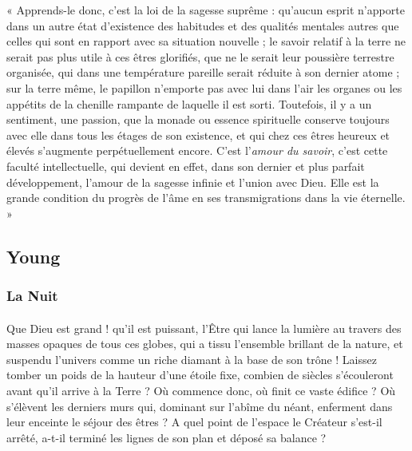 \documentclass[a4paper, 11pt, oneside]{article}
\begin{document}
« Apprends-le donc, c'est la loi de la sagesse suprême : qu'aucun esprit n'apporte dans un autre état d'existence des habitudes et des qualités mentales autres que celles qui sont en rapport avec sa situation nouvelle ; le savoir relatif à la terre ne serait pas plus utile à ces êtres glorifiés, que ne le serait leur poussière terrestre organisée, qui dans une température pareille serait réduite à son dernier atome ; sur la terre même, le papillon n'emporte pas avec lui dans l'air les organes ou les appétits de la chenille rampante de laquelle il est sorti. Toutefois, il y a un sentiment, une passion, que la monade ou essence spirituelle conserve toujours avec elle dans tous les étages de son existence, et qui chez ces êtres heureux et élevés s'augmente perpétuellement encore. C'est l'\emph{amour du savoir}, c'est cette faculté intellectuelle, qui devient en effet, dans son dernier et plus parfait développement, l'amour de la sagesse infinie et l'union avec Dieu. Elle est la grande condition du progrès de l'âme en ses transmigrations dans la vie éternelle. »
\clearpage
\subsection{Young}
\subsubsection{La Nuit}
\paragraph{}
Que Dieu est grand ! qu'il est puissant, l'Être qui lance la lumière au travers des masses opaques de tous ces globes, qui a tissu l'ensemble brillant de la nature, et suspendu l'univers comme un riche diamant à la base de son trône ! Laissez tomber un poids de la hauteur d'une étoile fixe, combien de siècles s'écouleront avant qu'il arrive à la Terre ? Où commence donc, où finit ce vaste édifice ? Où s'élèvent les derniers murs qui, dominant sur l'abîme du néant, enferment dans leur enceinte le séjour des êtres ? A quel point de l'espace le Créateur s'est-il arrêté, a-t-il terminé les lignes de son plan et déposé sa balance ?
\end{document}
